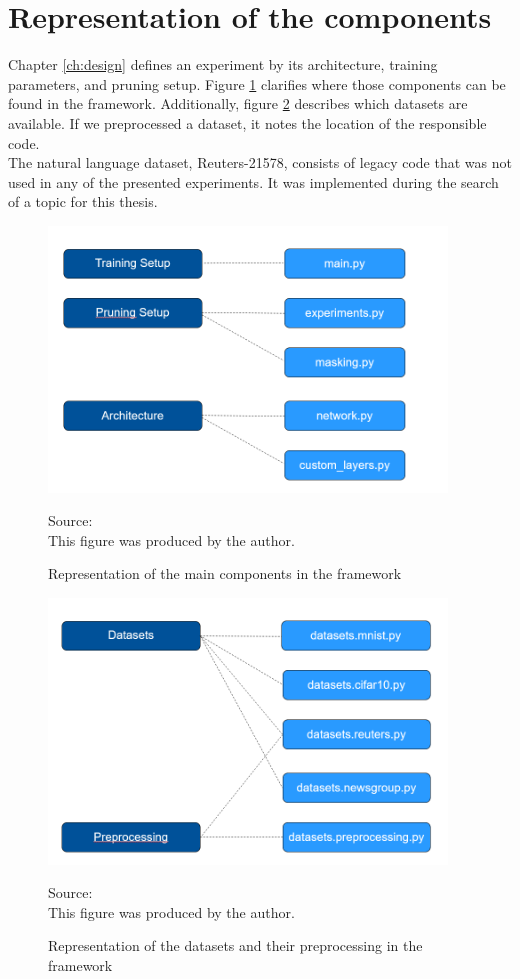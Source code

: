 \section{Representation of the components}
Chapter \ref{ch:design} defines an experiment by its architecture, training parameters, and pruning setup. Figure \ref{fig:Setup Representation} clarifies where those components can be found in the framework. 
Additionally, figure \ref{fig:Dataset Representation} describes which datasets are available. If we preprocessed a dataset, it notes the location of the responsible code.\\
The natural language dataset, Reuters-21578, consists of legacy code that was not used in any of the presented experiments. It was implemented during the search of a topic for this thesis.
\begin{figure}
	\centering
	\includegraphics[width=400px]{gfx/5-Implementation/setups.png}
	\caption{Representation of the main components in the framework}
	\label{fig:Setup Representation}
	\vspace{7pt}
	\footnotesize{
		Source:\\
		This figure was produced by the author.
	}
\end{figure}
\begin{figure}
	\centering
	\includegraphics[width=400px]{gfx/5-Implementation/datasets.png}
	\caption{Representation of the datasets and their preprocessing in the framework}
	\label{fig:Dataset Representation}
	\vspace{7pt}
	\footnotesize{
		Source:\\
		This figure was produced by the author.
	}
\end{figure}

